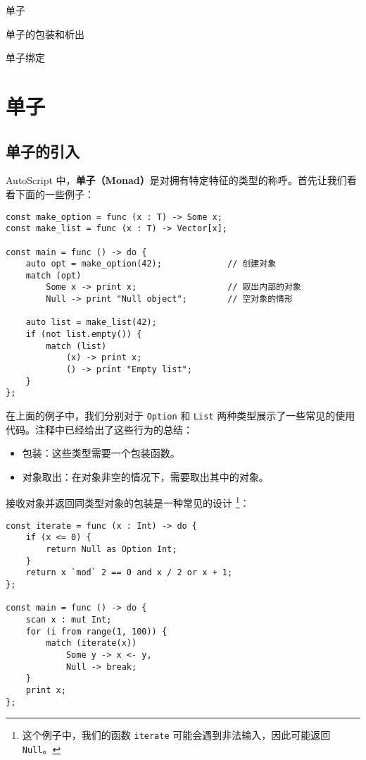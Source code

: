 \begin{introduction}
	\item 单子
	\item 单子的包装和析出
	\item 单子绑定
\end{introduction}

\section{单子}

\subsection{单子的引入}

AutoScript 中，\textbf{单子（Monad）}是对拥有特定特征的类型的称呼。首先让我们看看下面的一些例子：

\begin{lstlisting}
const make_option = func (x : T) -> Some x;
const make_list = func (x : T) -> Vector[x];

const main = func () -> do {
	auto opt = make_option(42);				// 创建对象
	match (opt)
		Some x -> print x;					// 取出内部的对象
		Null -> print "Null object";		// 空对象的情形
	
	auto list = make_list(42);
	if (not list.empty()) {
		match (list)
			(x) -> print x;
			() -> print "Empty list";
	}
};
\end{lstlisting}

在上面的例子中，我们分别对于 \lstinline!Option! 和 \lstinline!List! 两种类型展示了一些常见的使用代码。注释中已经给出了这些行为的总结：

\begin{itemize}
	\item 包装：这些类型需要一个包装函数。
	\item 对象取出：在对象非空的情况下，需要取出其中的对象。
\end{itemize}

接收对象并返回同类型对象的包装是一种常见的设计 \footnote{这个例子中，我们的函数 \lstinline!iterate! 可能会遇到非法输入，因此可能返回 \lstinline!Null!。}：

\begin{lstlisting}
const iterate = func (x : Int) -> do {
	if (x <= 0) {
		return Null as Option Int;
	}
	return x `mod` 2 == 0 and x / 2 or x + 1;
};

const main = func () -> do {
	scan x : mut Int;
	for (i from range(1, 100)) {
		match (iterate(x))
			Some y -> x <- y,
			Null -> break;
	}
	print x;
};
\end{lstlisting}

